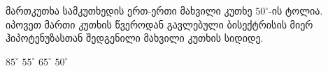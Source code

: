 მართკუთხა სამკუთხედის ერთ-ერთი მახვილი კუთხე \(50^{\circ}\)-ის ტოლია. იპოვეთ მართი კუთხის წვეროდან გავლებული ბისექტრისის მიერ ჰიპოტენუზასთან შედგენილი მახვილი კუთხის სიდიდე.

\answers
{\( 85 ^{\circ}\)}
{\( 55 ^{\circ}\)}
{\( 65 ^{\circ}\)}
{\( 50 ^{\circ}\)}
